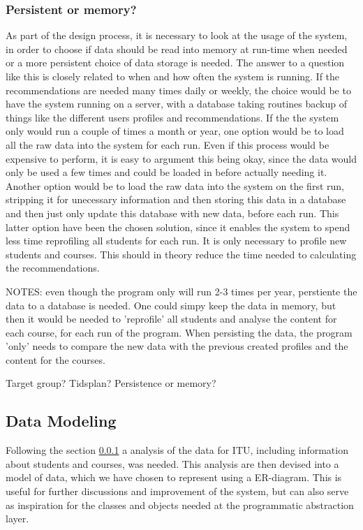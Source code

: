\subsubsection{Persistent or memory?}
\label{subsec:persistent}
As part of the design process, it is necessary to look at the usage of the system, in order to choose if data should be read into memory at run-time when needed or a more persistent choice of data storage is needed. The answer to a question like this is closely related to when and how often the system is running. If the recommendations are needed many times daily or weekly, the choice would be to have the system running on a server, with a database taking routines backup of things like the different users profiles and recommendations. If the the system only would run a couple of times a month or year, one option would be to load all the raw data into the system for each run. Even if this process would be expensive to perform, it is easy to argument this being okay, since the data would only be used a few times and could be loaded in before actually needing it. Another option would be to load the raw data into the system on the first run, stripping it for unecessary information and then storing this data in a database and then just only update this database with new data, before each run. This latter option have been the chosen solution, since it enables the system to spend less time reprofiling all students for each run. It is only necessary to profile new students and courses. This should in theory reduce the time needed to calculating the recommendations.

NOTES:
even though the program only will run 2-3 times per year, perstiente the data to a database is needed. One could simpy keep the data in memory, but then it would be needed to 'reprofile' all students and analyse the content for each course, for each run of the program. When persisting the data, the program 'only' needs to compare the new data with the previous created profiles and the content for the courses.


Target group?
Tidsplan?
Persistence or memory?
\subsection{Data Modeling}
Following the section \ref{subsec:persistent} a analysis of the data for ITU, including information about students and courses, was needed. This analysis are then devised into a model of data, which we have chosen to represent using a ER-diagram. This is useful for further discussions and improvement of the system, but can also serve as inspiration for the classes and objects needed at the programmatic abstraction layer. 

